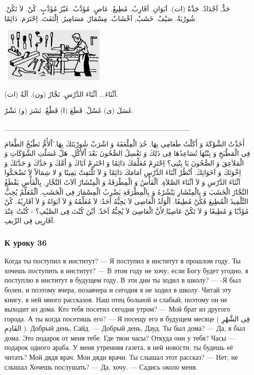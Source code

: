 \documentclass[a5paper]{article}
\begin{document}
جَدٌّ, اَجْدَادٌ. جَدَّةٌ (ات). اَبَوَانِ. اَقَارِبُ. مُطِيعٌ. عَاصٍ. مُؤَدَّبٌ. غَيْرُ مُؤَدَّبٍ. كُنْ. لاَ تَكُنْ. شُورْبَةٌ. صَيْفٌ. خَشَبٌ, اَخْشَابٌ. مِسْمَارٌ, مَسَامِيرُ. اِلْتَفَتَ. اِحْتَرَمَ. دَائِمًا. 

\  \includegraphics[width=1.948in,height=1.0626in]{images/MuhammadBagauddinprettified-img185.png} 

اَثْنَاءَ... اَثْنَاءَ الدَّرْسِ. نَجَّارٌ (ون). آلَةٌ (ات). 

غَسَلَ (ى) غَسْلٌ. قَطَعَ (ا) قَطْعٌ. نَشَرَ (و) نَشْرٌ.

\_\_\_\_\_\_\_\_\_\_\_\_\_\_\_\_\_\_\_\_\_\_\_\_\_\_\_\_\_\_\_\_\_\_\_\_

أَخَذْتُ الشَّوْكَةَ وَ أَكَلْتُ طَعَامِى بِهَا. خُذِ الْمِلْعَقَةَ وَ اشْرَبْ شُورْبَتَكَ بِهَا. َاْلأُمُّ تَطْبُخُ الطَّعَامَ فِى الْمَطْبَخِ وَ بِنْتُهَا تُسَاعِدُهَا فِى ذَلِكَ وَ تَغْسِلُ الصُّحُونَ بَعْدَ اْلأَكْلِ. هَلْ غَسَلْتِ الشَّوْكَاتِ وَ الْمَلاَعِقَ وَ الصُّحُونَ يَا بِنْتِى؟ اِحْتَرِمْ مُعَلِّمَكَ دَائِمًا وَ احْتَرِمْ اَبَاكَ وَ اُمَّكَ وَ جَدَّكَ وَ جَدَّتَكَ وَ اِخْوَتَكَ وَ اَخَوَاتِكَ. اُنْظُرْ اَثْنَاءَ الدَّرْسِ اَمَامَكَ دَائِمًا وَ لاَ تَلْتَفِتْ يَمِينًا وَ لا شِمَالاً لاَ تَضْحَكُوا اَثْنَاءَ الدَّرْسِ وَ لاَ اَثْنَاءَ الصَّلاَةِ. اَلْفَأْسُ وَ الْمِطْرَقَةُ وَ الْمِنْشَارُ آلاَتُ النَّجَّارِ. بِالْفَأْسِ يَقْطَعُ النَّجَّارُ الْخَشَبَ وَ بِالْمِنْشَارِ يَنْشُرُهُ وَ بِالْمِطْرَقَةِ يَضْرِبُ الْمِسْمَارَ فِى الْخَشَبِ. اَلْمُعَلِّمُ يُحِبُّ التِّلْمِيذَ الْمُطِيعَ فَكُنْ مُطِيعًا. اَلْوَلَدُ الْعَاصِى لاَ يَحِبُّهُ اَحَدٌ: لاَ مُعَلِّمُهُ وَ لاَ اَبَوَاهُ وَ لاَ اَقَارِبُهُ. كُنْ مُؤَدَّبًا وَ مُطِيعًا وَ لاَ تَكُنْ عَاصِيًا ِلأَنَّ الْعَاصِىَ لاَ يُحِبُّهُ اَحَدٌ. اَيْنَ كُنْتَ فِى الصَّيْفِ؟ - كُنْتُ عِنْدَ اَقَارِبِى فِى الرِّيفِ.

\subsubsection{К уроку 36}
Когда ты поступил в институт? — Я поступил в институт в прошлом году. Ты хочешь поступить в институт? — В этом году не хочу; если Богу будет угодно, я поступлю в институт в будущем году. В эти дни ты ходил в школу? — -Я был болен, и поэтому вчера, позавчера и сегодня я не ходил в школу. Читай эту книгу, в ней много рассказов. Наш отец больной и слабый, поэтому он не выходит из дома. Кто тебя посетил сегодня утром? — Мой брат из другого города. А ты когда посетишь его? — Я посещу его в будущем месяце ( فِى الشَّهْرِ القَادِمِ ). Добрый день, Сайд. — Добрый день, Дауд. Ты был дома? — Да, я был дома. Это подарок от меня тебе. Где твои часы? Откуда они у тебя? Часы — подарок одного араба. У меня утренняя газета, в ней новости; ты будешь её читать? Мой дядя врач. Мои дяди врачи. Ты слышал этот рассказ? — Нет, не слышал Хочешь послушать? — Да, хочу. — Садись около меня.
\end{document}
